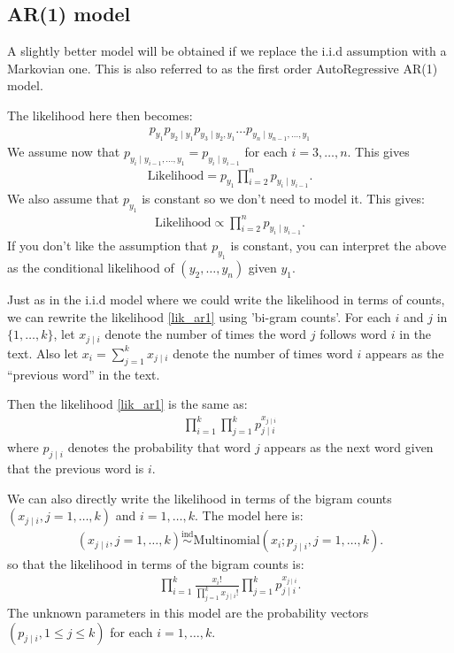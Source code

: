 \documentclass{scrartcl}
\begin{document}
\subsection{AR(1) model}

A slightly better model will be obtained if we replace the i.i.d
assumption with a Markovian one. This is also referred to as the first
order AutoRegressive AR(1) model.

The likelihood here then becomes:
\begin{align*}
  p_{y_1} p_{y_2 \mid y_1} p_{y_3 \mid y_2, y_1} \dots p_{y_n \mid
  y_{n-1}, \dots, y_1}
\end{align*}
We assume now that $p_{y_i \mid y_{i-1}, \dots, y_1} = p_{y_i \mid
  y_{i-1}}$ for each $i = 3, \dots, n$. This gives
\begin{align*}
  \text{Likelihood} = p_{y_1} \prod_{i=2}^n p_{y_i \mid y_{i-1}}. 
\end{align*}
We also assume that $p_{y_1}$ is constant so we don't need to model
it. This gives: 
\begin{align}\label{lik_ar1}
  \text{Likelihood} \propto  \prod_{i=2}^n p_{y_i \mid y_{i-1}}. 
\end{align}
If you don't like the assumption that $p_{y_1}$ is constant, you can
interpret the above as the conditional likelihood of $(y_2, \dots,
y_n)$ given $y_1$.

Just as in the i.i.d model where we could write the likelihood in
terms of counts, we can rewrite the likelihood \eqref{lik_ar1} using
'bi-gram counts'. For each $i$ and $j$ in $\{1, \dots, k\}$, let $x_{j
  \mid i}$ denote the number of times the word $j$ follows word $i$ in
the text. Also let $x_i = \sum_{j=1}^k x_{j \mid i}$ denote the number
of times word $i$ appears as the ``previous word'' in the text.

Then the likelihood \eqref{lik_ar1} is the same as:
\begin{align}\label{lik_ar1_c}
    \prod_{i=1}^k  \prod_{j=1}^k p_{j \mid i}^{x_{j \mid i}}
\end{align}
where $p_{j \mid i}$ denotes the probability that word $j$ appears
as the next word given that the previous word is $i$.

We can also directly write the likelihood in terms of the bigram
counts $(x_{j \mid i}, j = 1, \dots, k)$ and $i = 1, \dots, k$. The
model here is:
\begin{align*}
  (x_{j \mid i}, j = 1, \dots, k) \overset{\text{ind}}{\sim}
  \text{Multinomial}(x_i; p_{j \mid i}, j = 1, \dots, k). 
\end{align*}
so that the likelihood in terms of the bigram counts is: 
\begin{align}\label{lik_bigram}
  \prod_{i=1}^k  \frac{x_i!}{\prod_{j=1}^k x_{j \mid
  i}!} \prod_{j=1}^k p_{j \mid i}^{x_{j \mid i}}. 
\end{align}
The unknown parameters in this model are the probability vectors
$(p_{j \mid i}, 1 \leq j \leq k)$ for each $i = 1, \dots, k$.
\end{document}
